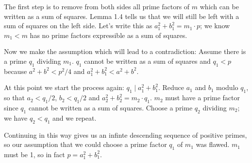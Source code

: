 \documentclass[b5paper,12pt,oneside,openright]{memoir}
\begin{document}
The first step is to remove from both sides all prime factors of $m$ which can be written as a sum of squares. Lemma 1.4 tells us that we will still be left with a sum of squares on the left side. Let's write this as $a_1^2+b_1^2=m_1\cdot p$; we know $m_1<m$ has no prime factors expressible as a sum of squares.

Now we make the assumption which will lead to a contradiction: Assume there is a prime $q_1$ dividing $m_1$. $q_1$ cannot be written as a sum of squares and $q_1<p$ because $a^2+b^2<p^2/4$ and $a_1^2+b_1^2<a^2+b^2$.

At this point we start the process again: $q_1\mid a_1^2+b_1^2$. Reduce $a_1$ and $b_1$ modulo $q_1$, so that $a_2<q_1/2$, $b_2<q_1/2$ and $a_2^2+b_2^2 = m_2\cdot q_1$. $m_2$ must have a prime factor since $q_1$ cannot be written as a sum of squares. Choose a prime $q_2$ dividing $m_2$; we have $q_2<q_1$ and we repeat.

Continuing in this way gives us an infinte descending sequence of positive primes, so our assumption that we could choose a prime factor $q_1$ of $m_1$ was flawed. $m_1$ must be 1, so in fact $p=a_1^2+b_1^2$.
\end{document}
